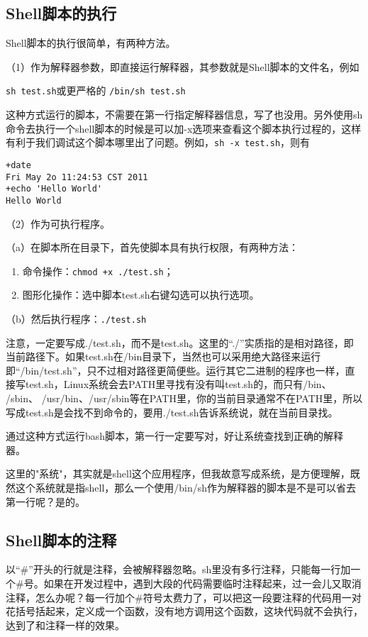 \subsection{Shell脚本的执行}
Shell脚本的执行很简单，有两种方法。

（1）作为解释器参数，即直接运行解释器，其参数就是Shell脚本的文件名，例如

\verb|sh test.sh|\qquad 或更严格的 \qquad \verb|/bin/sh test.sh|

这种方式运行的脚本，不需要在第一行指定解释器信息，写了也没用。另外使用sh命令去执行一个shell脚本的时候是可以加-x选项来查看这个脚本执行过程的，这样有利于我们调试这个脚本哪里出了问题。例如，\verb|sh -x test.sh|，则有
\begin{verbatim}
+date
Fri May 2o 11:24:53 CST 2011
+echo 'Hello World'
Hello World
\end{verbatim}

（2）作为可执行程序。

（a）在脚本所在目录下，首先使脚本具有执行权限，有两种方法：
\begin{enumerate}
\item 命令操作：\verb|chmod +x ./test.sh|；
\item 图形化操作：选中脚本test.sh右键勾选可以执行选项。
\end{enumerate}

（b）然后执行程序：\verb|./test.sh|

注意，一定要写成./test.sh，而不是test.sh。这里的“./”实质指的是相对路径，即当前路径下。如果test.sh在/bin目录下，当然也可以采用绝大路径来运行即“/bin/test.sh”，只不过相对路径更简便些。运行其它二进制的程序也一样，直接写test.sh，Linux系统会去PATH里寻找有没有叫test.sh的，而只有/bin、 /sbin、 /usr/bin、/usr/sbin等在PATH里，你的当前目录通常不在PATH里，所以写成test.sh是会找不到命令的，要用./test.sh告诉系统说，就在当前目录找。

通过这种方式运行bash脚本，第一行一定要写对，好让系统查找到正确的解释器。

这里的"系统"，其实就是shell这个应用程序，但我故意写成系统，是方便理解，既然这个系统就是指shell，那么一个使用/bin/sh作为解释器的脚本是不是可以省去第一行呢？是的。


\subsection{Shell脚本的注释}
以“\#”开头的行就是注释，会被解释器忽略。sh里没有多行注释，只能每一行加一个\#号。如果在开发过程中，遇到大段的代码需要临时注释起来，过一会儿又取消注释，怎么办呢？每一行加个\#符号太费力了，可以把这一段要注释的代码用一对花括号括起来，定义成一个函数，没有地方调用这个函数，这块代码就不会执行，达到了和注释一样的效果。


